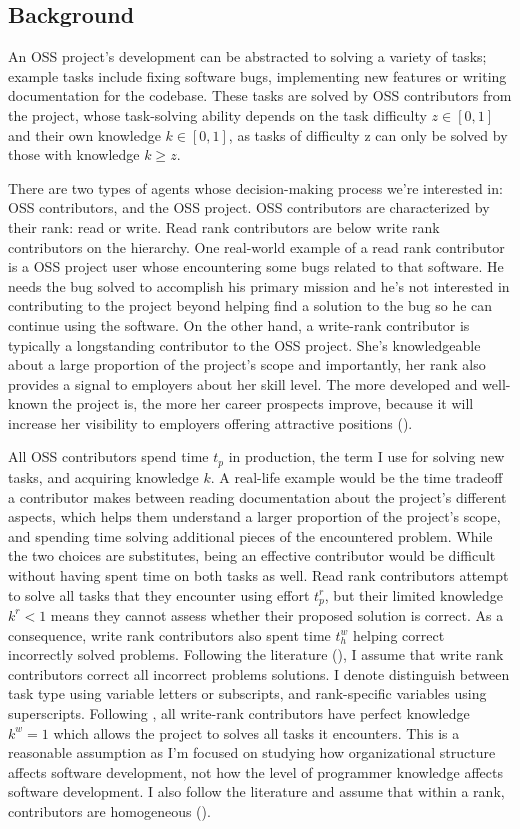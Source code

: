 \documentclass[source/paper/main.tex]{subfiles}
\begin{document}
\subsection{Background}
An OSS project's development can be abstracted to solving a variety of tasks; example tasks include fixing software bugs, implementing new features or writing documentation for the codebase. These tasks are solved by OSS contributors from the project, whose task-solving ability depends on the task difficulty $z \in [0, 1]$ and their own knowledge $k \in [0, 1]$, as tasks of difficulty z can only be solved by those with knowledge $k \geq z$. 

\qquad There are two types of agents whose decision-making process we're interested in: OSS contributors, and the OSS project. OSS contributors are characterized by their rank: read or write. Read rank contributors are below write rank contributors on the hierarchy. One real-world example of a read rank contributor is a OSS project user whose encountering some bugs related to that software. He needs the bug solved to accomplish his primary mission and he's not interested in contributing to the project beyond helping find a solution to the bug so he can continue using the software.  On the other hand, a write-rank contributor is typically a longstanding contributor to the OSS project. She's knowledgeable about a large proportion of the project's scope and importantly, her rank also provides a signal to employers about her skill level. The more developed and well-known the project is, the more her career prospects improve, because it will increase her visibility to employers offering attractive positions (\cite{hann_economic_2002}). 

\qquad  All OSS contributors spend time $t_p$ in production, the term I use for solving new tasks, and acquiring knowledge $k$. A real-life example would be the time tradeoff a contributor makes between reading documentation about the project's different aspects, which helps them understand a larger proportion of the project's scope, and spending time solving additional pieces of the encountered problem. While the two choices are substitutes, being an effective contributor would be difficult without having spent time on both tasks as well. Read rank contributors attempt to solve all tasks that they encounter using effort $t_p^r$, but their limited knowledge $k^r < 1$ means they cannot assess whether their proposed solution is correct. As a consequence, write rank contributors also spent time $t_h^w$ helping correct incorrectly solved problems. Following the literature (\cite{garicano_hierarchies_2000}), I assume that write rank contributors correct all incorrect problems solutions. I denote distinguish between task type using variable letters or subscripts, and rank-specific variables using superscripts. Following \cite{bloom_distinct_2014}, all write-rank contributors have perfect knowledge $k^w = 1$ which allows the project to solves all tasks it encounters. This is a reasonable assumption as I'm focused on studying how organizational structure affects software development, not how the level of programmer knowledge affects software development. I also follow the literature and assume that within a rank, contributors are homogeneous (\cite{garicano_hierarchies_2000}). 
\end{document}
